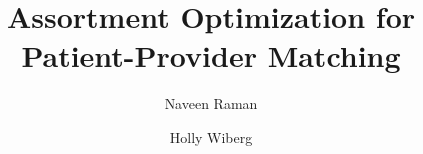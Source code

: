 \documentclass[11pt]{article}
\title{Assortment Optimization for Patient-Provider Matching}
\author[1]{Naveen Raman}
\author[1]{Holly Wiberg}
\date{}
\affil[1]{Carnegie Mellon University}
\affil[1]{\texttt{\{naveenr, hwiberg\}@cmu.edu}}
\begin{document}
 \maketitle


\begin{abstract}
    
\end{abstract}








\pagebreak
 



\pagebreak

\appendix


\end{document}
